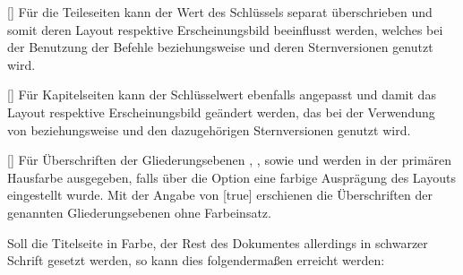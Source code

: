 \begin{Declaration*}{}
\begin{Declaration*}{}
\begin{Declaration*}{}
\begin{Declaration}{[\PSet]}
\printdeclarationlist%
%
%
Für die Teileseiten kann der Wert des Schlüssels  separat 
überschrieben und somit deren Layout respektive Erscheinungsbild beeinflusst 
werden, welches bei der Benutzung der Befehle  beziehungsweise 
 und deren Sternversionen genutzt wird.
\end{Declaration}

\begin{Declaration}{[\PSet]}
\printdeclarationlist%
%
%
Für Kapitelseiten kann der Schlüsselwert  ebenfalls angepasst und 
damit das Layout respektive Erscheinungsbild geändert werden, das bei der 
Verwendung von  beziehungsweise  und den 
dazugehörigen Sternversionen genutzt wird.
\end{Declaration}

\begin{Declaration}[v2.05]{[\PSet]}
\printdeclarationlist%
%
Für Überschriften der Gliederungsebenen , , 
 sowie  und  werden 
in der primären Hausfarbe  ausgegeben, falls über die Option 
 eine farbige Ausprägung des Layouts eingestellt wurde. Mit der 
Angabe von [true] erschienen die Überschriften der genannten 
Gliederungsebenen ohne Farbeinsatz.
\end{Declaration}
%
%
%
\begin{Example}
Soll die Titelseite in Farbe, der Rest des Dokumentes allerdings in schwarzer 
Schrift gesetzt werden, so kann dies folgendermaßen erreicht werden:
\end{Example}




\end{Declaration*}
\end{Declaration*}
\end{Declaration*}
